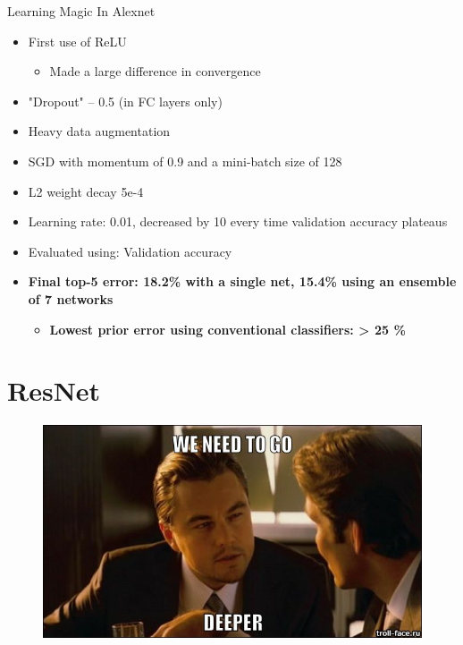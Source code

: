 \documentclass[serif, aspectratio=169]{beamer}
\begin{document}
\begin{frame}{Learning Magic In Alexnet}
	\begin{itemize}
		\item First use of ReLU
		\begin{itemize}
			\item Made a large difference in convergence
		\end{itemize}
		\item "Dropout" – 0.5 (in FC layers only)
		\item Heavy data augmentation
		\item SGD with momentum of 0.9 and a mini-batch size of 128
		\item L2 weight decay 5e-4
		\item Learning rate: 0.01, decreased by 10 every time validation accuracy plateaus
		\item Evaluated using: Validation accuracy
		\item \textbf{Final top-5 error: 18.2\% with a single net, 15.4\% using an ensemble of 7 networks}
		\begin{itemize}
			\item \textbf{Lowest prior error using conventional classifiers: > 25 \%}
		\end{itemize}
	\end{itemize}
\end{frame}

\section{ResNet}

\begin{frame}
	\begin{figure}[htpb]
		\begin{center}
			\includegraphics[keepaspectratio, scale=0.5]{pic/deeper}
		\end{center}
	\end{figure}
\end{frame}
\end{document}
